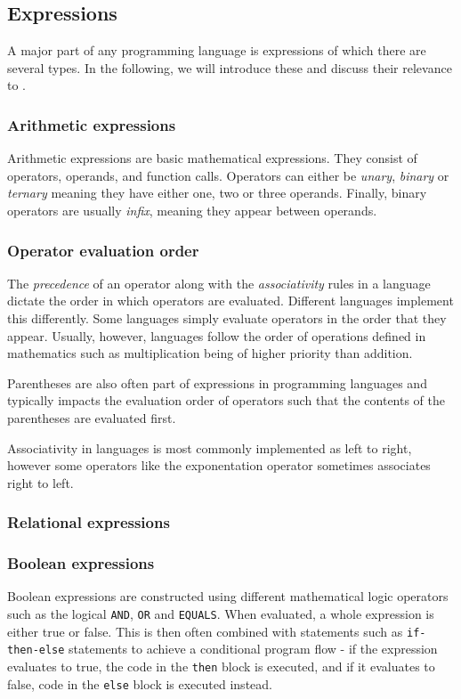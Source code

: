 \subsection{Expressions}
A major part of any programming language is expressions of which there are several types.
In the following, we will introduce these and discuss their relevance to \dazel{}.

\subsubsection*{Arithmetic expressions}
Arithmetic expressions are basic mathematical expressions.
They consist of operators, operands, and function calls. 
Operators can either be \textit{unary}, \textit{binary} or \textit{ternary} meaning they have either one, two or three operands.
Finally, binary operators are usually \textit{infix}, meaning they appear between operands.

\subsubsection*{Operator evaluation order}
The \textit{precedence} of an operator along with the \textit{associativity} rules in a language dictate the order in which operators are evaluated.
Different languages implement this differently. Some languages simply evaluate operators in the order that they appear. Usually, however, languages follow the order of operations defined in mathematics such as multiplication being of higher priority than addition.


Parentheses are also often part of expressions in programming languages and typically impacts the evaluation order of operators such that the contents of the parentheses are evaluated first.


Associativity in languages is most commonly implemented as left to right, however some operators like the exponentation operator sometimes associates right to left. 

\subsubsection*{Relational expressions}


\subsubsection*{Boolean expressions}
Boolean expressions are constructed using different mathematical logic operators such as the logical \texttt{AND}, \texttt{OR} and \texttt{EQUALS}. 
When evaluated, a whole expression is either true or false. 
This is then often combined with statements such as \texttt{if-then-else} statements to achieve a conditional program flow - if the expression evaluates to true, the code in the \texttt{then} block is executed, and if it evaluates to false, code in the \texttt{else} block is executed instead.

